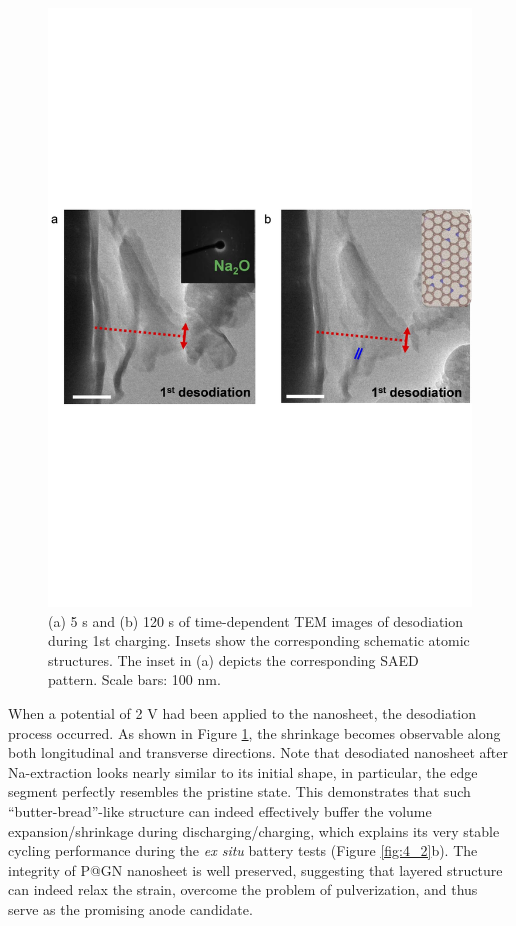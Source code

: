\begin{figure}  
\includegraphics[width=\textwidth,angle=0]{figures/figure4_3ef}
\caption[{\em in situ} desodiation process on P@GN SIB]
{
  (a) 5 s and (b) 120 s of time-dependent TEM images of desodiation during 1st charging. Insets show the corresponding schematic atomic structures. The inset in (a) depicts the corresponding SAED pattern. Scale bars: 100 nm.
\label{fig:4_3ef}}
\end{figure}

When a potential of 2 V had been applied to the nanosheet, the desodiation process occurred. As shown in Figure \ref{fig:4_3ef}, the shrinkage becomes observable along both longitudinal and transverse directions. Note that desodiated nanosheet after Na-extraction looks nearly similar to its initial shape, in particular, the edge segment perfectly resembles the pristine state. This demonstrates that such “butter-bread”-like structure can indeed effectively buffer the volume expansion/shrinkage during discharging/charging, which explains its very stable cycling performance during the {\em ex situ} battery tests (Figure \ref{fig:4_2}b). The integrity of P@GN nanosheet is well preserved, suggesting that layered structure can indeed relax the strain, overcome the problem of pulverization, and thus serve as the promising anode candidate.\\

